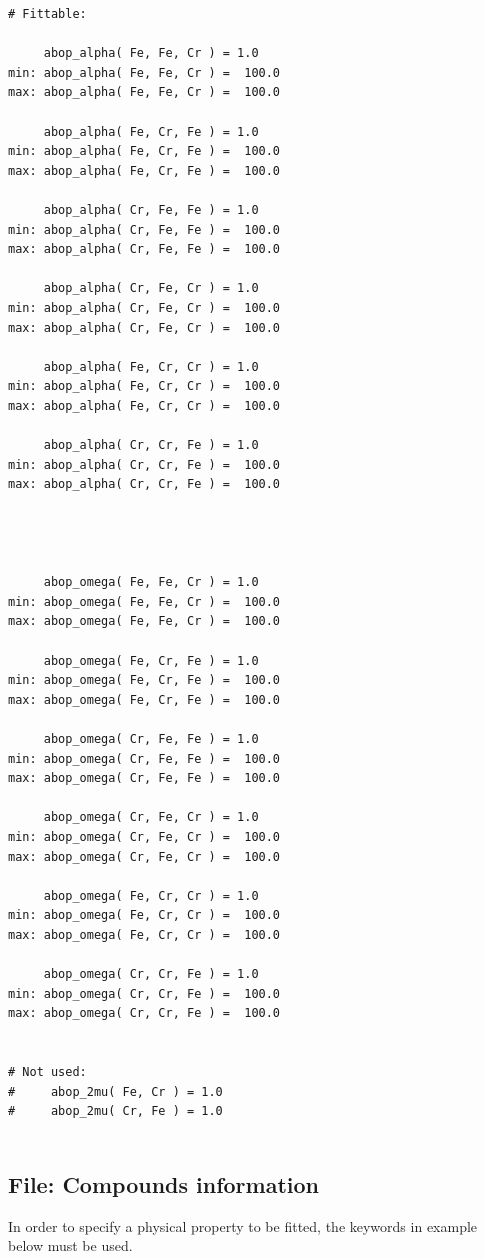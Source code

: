 \documentclass[a4paper,12pt,pdftex,onecolumn]{article}
\begin{document}
\begin{Verbatim}[fontsize=\relsize{-1},frame=single]
# Fittable:

     abop_alpha( Fe, Fe, Cr ) = 1.0
min: abop_alpha( Fe, Fe, Cr ) =  100.0
max: abop_alpha( Fe, Fe, Cr ) =  100.0

     abop_alpha( Fe, Cr, Fe ) = 1.0
min: abop_alpha( Fe, Cr, Fe ) =  100.0
max: abop_alpha( Fe, Cr, Fe ) =  100.0

     abop_alpha( Cr, Fe, Fe ) = 1.0
min: abop_alpha( Cr, Fe, Fe ) =  100.0
max: abop_alpha( Cr, Fe, Fe ) =  100.0

     abop_alpha( Cr, Fe, Cr ) = 1.0
min: abop_alpha( Cr, Fe, Cr ) =  100.0
max: abop_alpha( Cr, Fe, Cr ) =  100.0

     abop_alpha( Fe, Cr, Cr ) = 1.0
min: abop_alpha( Fe, Cr, Cr ) =  100.0
max: abop_alpha( Fe, Cr, Cr ) =  100.0

     abop_alpha( Cr, Cr, Fe ) = 1.0
min: abop_alpha( Cr, Cr, Fe ) =  100.0
max: abop_alpha( Cr, Cr, Fe ) =  100.0




     abop_omega( Fe, Fe, Cr ) = 1.0
min: abop_omega( Fe, Fe, Cr ) =  100.0
max: abop_omega( Fe, Fe, Cr ) =  100.0

     abop_omega( Fe, Cr, Fe ) = 1.0
min: abop_omega( Fe, Cr, Fe ) =  100.0
max: abop_omega( Fe, Cr, Fe ) =  100.0

     abop_omega( Cr, Fe, Fe ) = 1.0
min: abop_omega( Cr, Fe, Fe ) =  100.0
max: abop_omega( Cr, Fe, Fe ) =  100.0

     abop_omega( Cr, Fe, Cr ) = 1.0
min: abop_omega( Cr, Fe, Cr ) =  100.0
max: abop_omega( Cr, Fe, Cr ) =  100.0

     abop_omega( Fe, Cr, Cr ) = 1.0
min: abop_omega( Fe, Cr, Cr ) =  100.0
max: abop_omega( Fe, Cr, Cr ) =  100.0

     abop_omega( Cr, Cr, Fe ) = 1.0
min: abop_omega( Cr, Cr, Fe ) =  100.0
max: abop_omega( Cr, Cr, Fe ) =  100.0


# Not used:
#     abop_2mu( Fe, Cr ) = 1.0
#     abop_2mu( Cr, Fe ) = 1.0


\end{Verbatim}








\subsection{File: Compounds information}

In order to specify a physical property to be fitted,
the keywords in example below must be used.
\end{document}
